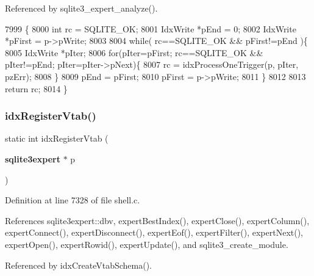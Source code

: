 Referenced by sqlite3\+\_\+expert\+\_\+analyze().


\begin{DoxyCode}
7999                                                              \{
8000   \textcolor{keywordtype}{int} rc = SQLITE_OK;
8001   IdxWrite *pEnd = 0;
8002   IdxWrite *pFirst = p->pWrite;
8003 
8004   \textcolor{keywordflow}{while}( rc==SQLITE_OK && pFirst!=pEnd )\{
8005     IdxWrite *pIter;
8006     \textcolor{keywordflow}{for}(pIter=pFirst; rc==SQLITE_OK && pIter!=pEnd; pIter=pIter->pNext)\{
8007       rc = idxProcessOneTrigger(p, pIter, pzErr);
8008     \}
8009     pEnd = pFirst;
8010     pFirst = p->pWrite;
8011   \}
8012 
8013   \textcolor{keywordflow}{return} rc;
8014 \}
\end{DoxyCode}
\mbox{\label{shell_8c_acab9fa71f41fd7897853ffba84fa6f88}} 
\subsubsection{idx\+Register\+Vtab()}
{\footnotesize\ttfamily static int idx\+Register\+Vtab (\begin{DoxyParamCaption}\item[{\textbf{ sqlite3expert} $\ast$}]{p }\end{DoxyParamCaption})\hspace{0.3cm}{\ttfamily [static]}}



Definition at line 7328 of file shell.\+c.



References sqlite3expert\+::dbv, expert\+Best\+Index(), expert\+Close(), expert\+Column(), expert\+Connect(), expert\+Disconnect(), expert\+Eof(), expert\+Filter(), expert\+Next(), expert\+Open(), expert\+Rowid(), expert\+Update(), and sqlite3\+\_\+create\+\_\+module.



Referenced by idx\+Create\+Vtab\+Schema().


